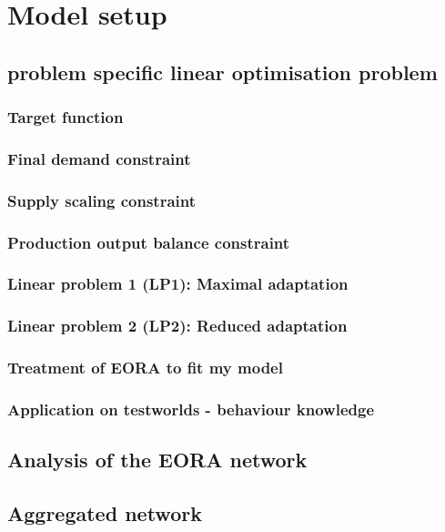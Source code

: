 \chapter{Model setup}

\section{problem specific linear optimisation problem}

\subsection{Target function}


\subsection{Final demand constraint}


\subsection{Supply scaling constraint}


\subsection{Production output balance constraint}  


\subsection{Linear problem 1 (LP1): Maximal adaptation}


\subsection{Linear problem 2 (LP2): Reduced adaptation}


\subsection{Treatment of EORA to fit my model}


\subsection{Application on testworlds - behaviour knowledge}

\section{Analysis of the EORA network}


\section{Aggregated network}
